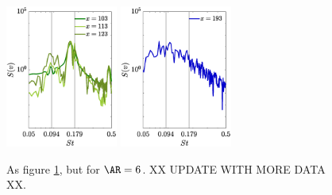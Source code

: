 \begin{figure}
\includegraphics[width=0.328\textwidth]{./fig/appendix/Spec_AR6_Re450_b.eps}
\includegraphics[width=0.328\textwidth]{./fig/appendix/Spec_AR6_Re450_c.eps}
\caption{As figure \ref{fig:wake_AR6}, but for $\AR=6$. XX UPDATE WITH MORE DATA XX.}
\label{fig:wake_AR6}
\end{figure}
\fi



